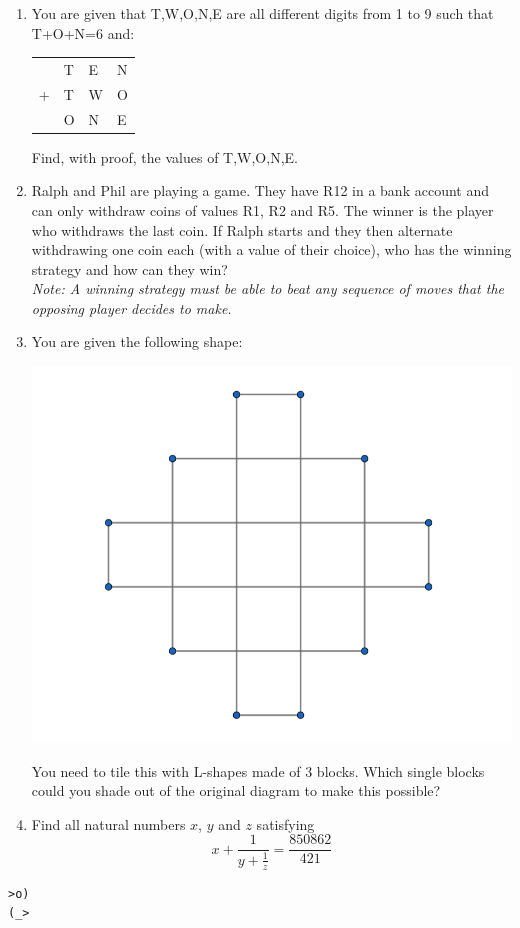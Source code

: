 \begin{enumerate}[1.]
\item You are given that T,W,O,N,E are all different digits from 1 to 9 such that T+O+N=6 and:
\begin{center}
\begin{tabular}{m{1cm} m{0.5cm} m{0.5cm} m{0.5cm}}
&T&E&N\\
+&T&W&O\\
\hline
&O&N&E\\
\hline
\end{tabular}
\end{center}
Find, with proof, the values of T,W,O,N,E.


\item Ralph and Phil are playing a game. They have R12 in a bank account and can only withdraw coins of values R1, R2 and R5. The winner is the player who withdraws the last coin. If Ralph starts and they then alternate withdrawing one coin each (with a value of their choice), who has the winning strategy and how can they win?\\
\textit{Note: A winning strategy must be able to beat any sequence of moves that the opposing player decides to make.}


\item You are given the following shape: %
	\begin{center}
	\includegraphics[scale=0.3]{Capture.png}	
	\end{center}
	You need to tile this with L-shapes made of 3 blocks. Which single blocks could you shade out of the original diagram to make this possible?


\item %
Find all natural numbers $x$, $y$ and $z$ satisfying 
$$x + \frac{1}{y + \frac{1}{z}} = \frac{850862}{421}$$


\end{enumerate}


\vfill
\centering
\begin{BVerbatim}
>o)
(_>
\end{BVerbatim}


